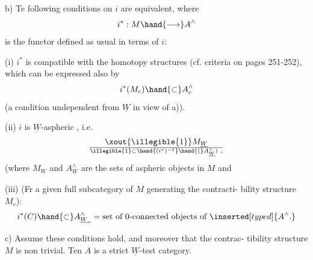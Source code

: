b) Te following conditions on $i$ are equivalent, where
\[ i^* : M \hand{\longrightarrow} A^\wedge \]
is the functor defined as usual in terms of $i$:

(i) $i^*$ is compatible with the homotopy structures (cf. criteria on
pages 251-252), which can be expressed also by
\[ i^*(M_c) \hand{\subset} A^\wedge_c \]
(a condition undependent from $\underline{W}$\hand{,} in view of a)).

(ii) $i$ is $\underline{W}$-aspheric , i.e.
\[ \xout{\illegible{1}}M_{\underline{W}} \over{\illegible{1}}{\subset}\hand{(i^*)^{-1}}\hand{(}A^\wedge_{\underline{W}}) \ , \]
(where $M_{\underline{W}}$ and $A^\wedge_{\underline{W}}$ are the sets of  aspheric objects in $M$ and 

(iii) (Fr a given full subcategory  of $M$ generating the contracti-%
bility structure $M_c$):
\[ i^*(C) \hand{\subset} A^\wedge_{\underline{W}_o} = \text{set of 0-connected objects of } \inserted[typed]{A^\wedge.} \]

c) Assume these conditions hold, and moreover that the contrac-%
tibility structure  $M$ is non trivial. Ten $A$ is a strict $\underline{W}$-test
category.


